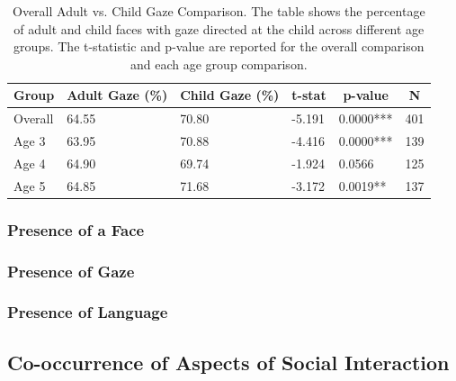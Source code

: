 \documentclass[
  man,floatsintext]{apa6}
\begin{document}
\begin{table}[tbp]

\begin{center}
\begin{threeparttable}

\caption{\label{tab:gaze-percentage-overall-comparison}Overall Adult vs. Child Gaze Comparison. The table shows the percentage of adult and child faces with gaze directed at the child across different age groups. The t-statistic and p-value are reported for the overall comparison and each age group comparison.}

\begin{tabular}{llllll}
\toprule
Group & \multicolumn{1}{c}{Adult Gaze (\%)} & \multicolumn{1}{c}{Child Gaze (\%)} & \multicolumn{1}{c}{t-stat} & \multicolumn{1}{c}{p-value} & \multicolumn{1}{c}{N}\\
\midrule
Overall & 64.55 & 70.80 & -5.191 & 0.0000*** & 401\\
Age 3 & 63.95 & 70.88 & -4.416 & 0.0000*** & 139\\
Age 4 & 64.90 & 69.74 & -1.924 & 0.0566 & 125\\
Age 5 & 64.85 & 71.68 & -3.172 & 0.0019** & 137\\
\bottomrule
\end{tabular}

\end{threeparttable}
\end{center}

\end{table}

\subsubsection{Presence of a Face}\label{presence-of-a-face}

\subsubsection{Presence of Gaze}\label{presence-of-gaze}

\subsubsection{Presence of Language}\label{presence-of-language}

\subsection{Co-occurrence of Aspects of Social Interaction}\label{co-occurrence-of-aspects-of-social-interaction}
\end{document}
